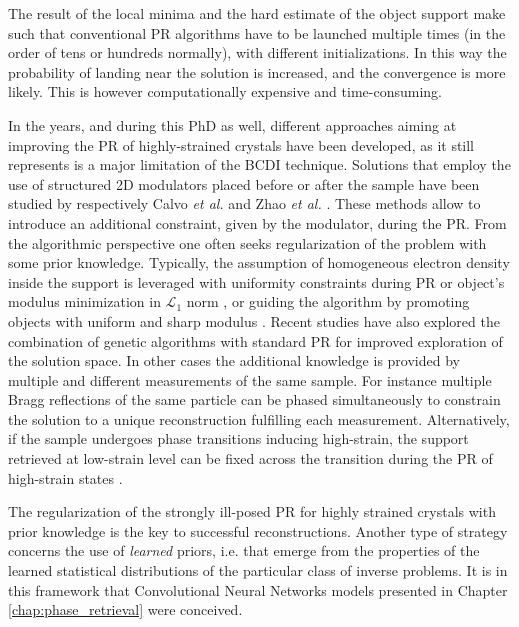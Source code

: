 The result of the local minima and the hard estimate of the object support make such that conventional PR algorithms
have to be launched multiple times (in the order of tens or hundreds normally), with different initializations. In this way the probability 
of landing near the solution is increased, and the convergence is more likely. This is however computationally expensive 
and time-consuming. 

In the years, and during this PhD as well, different approaches aiming at improving the PR of highly-strained crystals 
have been developed, as it still represents is a major limitation of the BCDI technique.
Solutions that employ the use of structured 2D modulators placed before or after the sample have been studied by respectively 
Calvo \textit{et al.} \cite{Calvo_2024} and Zhao \textit{et al.} \cite{Zhao_2023}. These methods allow to introduce an 
additional constraint, given by the modulator, during the PR. From the algorithmic perspective one often seeks regularization 
of the problem with some prior knowledge. Typically, the assumption of homogeneous electron density inside the support 
is leveraged with uniformity constraints during PR \cite{Minkevich2007_virginie, Minkevich2008_baumbach, Madsen2021} or 
object's modulus minimization in $\mathcal{L}_1$ norm \cite{NewtonStrain_2010}, or guiding the algorithm by promoting 
objects with uniform and sharp modulus \cite{Ulvestad2017_Guided}. Recent studies have also explored the combination 
of genetic algorithms with standard PR \cite{WilkinGenetic_2021} for improved exploration of the solution space. 
In other cases the additional knowledge is provided by multiple and different measurements of the same sample. For 
instance multiple Bragg reflections of the same particle can be phased simultaneously \cite{Gao_2021} to constrain the 
solution to a unique reconstruction fulfilling each measurement. Alternatively, if the sample undergoes phase transitions 
inducing high-strain, the support retrieved at low-strain level can be fixed across the transition during the PR of 
high-strain states \cite{Wang_2020}. 

The regularization of the strongly ill-posed PR for highly strained crystals with prior knowledge is the key to 
successful reconstructions. Another type of strategy concerns the use of \textit{learned} priors, i.e. that emerge from 
the properties of the learned statistical distributions of the particular class of inverse problems. It is in this 
framework that Convolutional Neural Networks models presented in Chapter \ref{chap:phase_retrieval} were conceived. 


